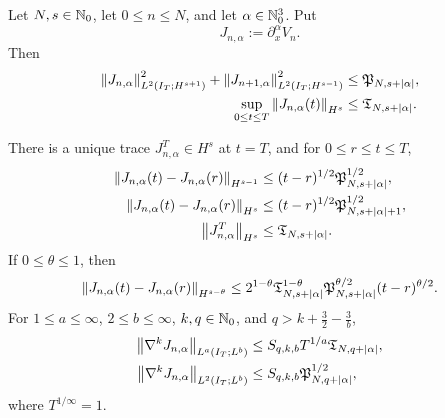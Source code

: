 \begin{theorem}
\label{thm:qc-mixed-jet}
\begin{samepage}
Let \(N,s\in\mathbb N_0\), let \(0\le n\le N\), and let
\(\alpha\in\mathbb N_0^3\).  Put
\[
 J_{n,\alpha}:=\partial_x^\alpha V_n.
\]
Then
\begin{align}
 \left\lVert J_{n,\alpha}\right\rVert_{L^2(I_T;H^{s+1})}^2
 +\left\lVert J_{n+1,\alpha}\right\rVert_{L^2(I_T;H^{s-1})}^2
 &\le \mathfrak P_{N,s+|\alpha|},
 \label{eq:qc-mixed-adjacent}\\
 \sup_{0\le t\le T}\left\lVert J_{n,\alpha}(t)\right\rVert_{H^s}
 &\le \mathfrak T_{N,s+|\alpha|}.
 \label{eq:qc-mixed-trace}
\end{align}
\end{samepage}
There is a unique trace \(J_{n,\alpha}^T\in H^s\) at \(t=T\), and
for \(0\le r\le t\le T\),
\begin{align}
 \left\lVert J_{n,\alpha}(t)-J_{n,\alpha}(r)\right\rVert_{H^{s-1}}
 &\le (t-r)^{1/2}\mathfrak P_{N,s+|\alpha|}^{1/2},
 \label{eq:qc-mixed-low-modulus}\\
 \left\lVert J_{n,\alpha}(t)-J_{n,\alpha}(r)\right\rVert_{H^s}
 &\le (t-r)^{1/2}
        \mathfrak P_{N,s+|\alpha|+1}^{1/2},
 \label{eq:qc-mixed-strong-modulus}\\
 \left\lVert J_{n,\alpha}^T\right\rVert_{H^s}
 &\le \mathfrak T_{N,s+|\alpha|}.
 \label{eq:qc-mixed-endpoint-size}
\end{align}
If \(0\le\theta\le1\), then
\begin{equation}
 \left\lVert J_{n,\alpha}(t)-J_{n,\alpha}(r)\right\rVert_{H^{s-\theta}}
 \le
 2^{1-\theta}
 \mathfrak T_{N,s+|\alpha|}^{1-\theta}
 \mathfrak P_{N,s+|\alpha|}^{\theta/2}
 (t-r)^{\theta/2}.
 \label{eq:qc-mixed-interpolated-modulus}
\end{equation}
For \(1\le a\le\infty\), \(2\le b\le\infty\),
\(k,q\in\mathbb N_0\), and
\(q>k+\frac32-\frac3b\),
\begin{align}
 \left\lVert \nabla^kJ_{n,\alpha}\right\rVert_{L^a(I_T;L^b)}
 &\le S_{q,k,b}T^{1/a}\mathfrak T_{N,q+|\alpha|},
 \label{eq:qc-mixed-la-lb}\\
 \left\lVert \nabla^kJ_{n,\alpha}\right\rVert_{L^2(I_T;L^b)}
 &\le S_{q,k,b}\mathfrak P_{N,q+|\alpha|}^{1/2},
 \label{eq:qc-mixed-l2-lb}
\end{align}
where \(T^{1/\infty}=1\).
\end{theorem}

